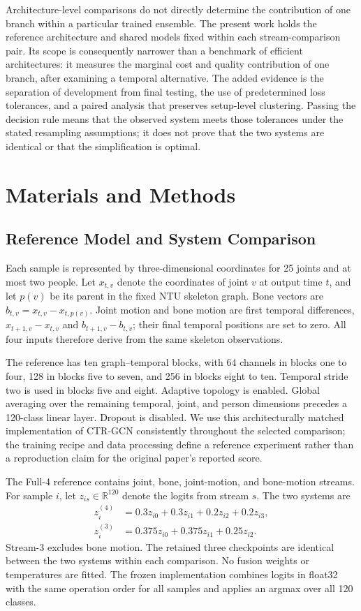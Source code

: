 \documentclass[ai,article,submit,moreauthors]{Definitions/mdpi}
\begin{document}
Architecture-level comparisons do not directly determine the contribution of one branch within a particular trained ensemble. The present work holds the reference architecture and shared models fixed within each stream-comparison pair. Its scope is consequently narrower than a benchmark of efficient architectures: it measures the marginal cost and quality contribution of one branch, after examining a temporal alternative. The added evidence is the separation of development from final testing, the use of predetermined loss tolerances, and a paired analysis that preserves setup-level clustering. Passing the decision rule means that the observed system meets those tolerances under the stated resampling assumptions; it does not prove that the two systems are identical or that the simplification is optimal.
\section{Materials and Methods}

\subsection{Reference Model and System Comparison}

Each sample is represented by three-dimensional coordinates for 25 joints and at most two people. Let $x_{t,v}$ denote the coordinates of joint $v$ at output time $t$, and let $p(v)$ be its parent in the fixed NTU skeleton graph. Bone vectors are $b_{t,v}=x_{t,v}-x_{t,p(v)}$. Joint motion and bone motion are first temporal differences, $x_{t+1,v}-x_{t,v}$ and $b_{t+1,v}-b_{t,v}$; their final temporal positions are set to zero. All four inputs therefore derive from the same skeleton observations.

The reference has ten graph--temporal blocks, with 64 channels in blocks one to four, 128 in blocks five to seven, and 256 in blocks eight to ten. Temporal stride two is used in blocks five and eight. Adaptive topology is enabled. Global averaging over the remaining temporal, joint, and person dimensions precedes a 120-class linear layer. Dropout is disabled. We use this architecturally matched implementation of CTR-GCN \cite{chen2021ctrgcn} consistently throughout the selected comparison; the training recipe and data processing define a reference experiment rather than a reproduction claim for the original paper's reported score.

The Full-4 reference contains joint, bone, joint-motion, and bone-motion
streams. For sample $i$, let $z_{is}\in\mathbb{R}^{120}$ denote the logits
from stream $s$. The two systems are
\begin{align}
 z_i^{(4)} &=0.3z_{i0}+0.3z_{i1}+0.2z_{i2}+0.2z_{i3},\\
 z_i^{(3)} &=0.375z_{i0}+0.375z_{i1}+0.25z_{i2}.
\end{align}
Stream-3 excludes bone motion. The retained three checkpoints are identical
between the two systems within each comparison. No fusion weights or
temperatures are fitted. The frozen implementation combines logits in
float32 with the same operation order for all samples and applies an argmax
over all 120 classes.
\end{document}
